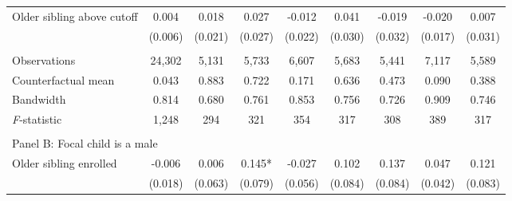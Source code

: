 \begin{table}[!htbp]
{{\begin{tabular}{lcccccccc}
Older sibling above cutoff&       0.004   &       0.018   &       0.027   &      -0.012   &       0.041   &      -0.019   &      -0.020   &       0.007   \\
                    &     (0.006)   &     (0.021)   &     (0.027)   &     (0.022)   &     (0.030)   &     (0.032)   &     (0.017)   &     (0.031)   \\
                    &               &               &               &               &               &               &               &               \\
Observations        &      24,302   &       5,131   &       5,733   &       6,607   &       5,683   &       5,441   &       7,117   &       5,589   \\
Counterfactual mean &       0.043   &       0.883   &       0.722   &       0.171   &       0.636   &       0.473   &       0.090   &       0.388   \\
Bandwidth           &       0.814   &       0.680   &       0.761   &       0.853   &       0.756   &       0.726   &       0.909   &       0.746   \\
\textit{F}-statistic&       1,248   &         294   &         321   &         354   &         317   &         308   &         389   &         317   \\
 
&  &  &  & & & & & \\
\multicolumn{10}{l}{Panel B: Focal child is a male} \\
Older sibling enrolled&      -0.006   &       0.006   &       0.145*  &      -0.027   &       0.102   &       0.137   &       0.047   &       0.121   \\
                    &     (0.018)   &     (0.063)   &     (0.079)   &     (0.056)   &     (0.084)   &     (0.084)   &     (0.042)   &     (0.083)   \\
 

\end{tabular}}}
\end{table}
